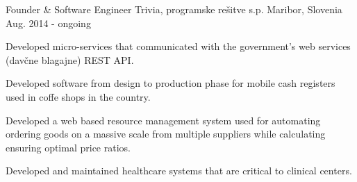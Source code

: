 \begin{cventries}
  \cventry
    {Founder \& Software Engineer} %
    {Trivia, programske rešitve s.p.} %
    {Maribor, Slovenia} %
    {Aug. 2014 - ongoing} %
    {
      \begin{cvitems} %
        \item {Developed micro-services that communicated with the 
        government's web services (davčne blagajne) REST API.}
        \item {Developed software from design to production phase for 
        mobile cash registers used in coffe shops in the country.}
        \item {Developed a web based resource management system used 
        for automating ordering goods on a massive scale from multiple 
        suppliers while calculating ensuring optimal price ratios.}
        \item {Developed and maintained healthcare systems that are 
        critical to clinical centers. }
      \end{cvitems}
    }

\end{cventries}
